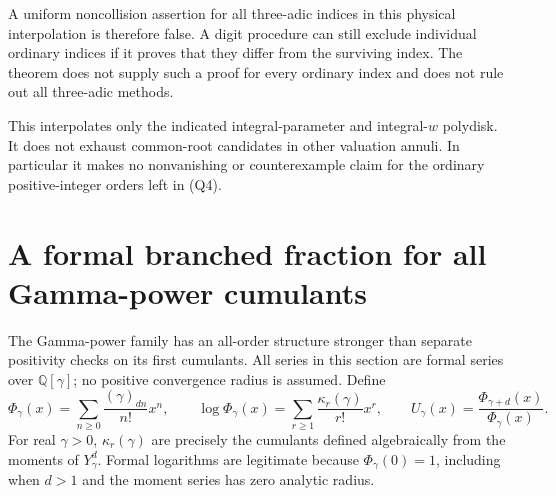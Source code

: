\documentclass[11pt]{article}
\begin{document}
A uniform noncollision assertion for all three-adic indices in this
physical interpolation is therefore false. A digit procedure can still
exclude individual ordinary indices if it proves that they differ from
the surviving index. The theorem does not supply such a proof for every
ordinary index and does not rule out all three-adic methods.

This interpolates only the indicated integral-parameter and integral-$w$
polydisk. It does not exhaust common-root candidates in other valuation
annuli. In particular it makes no nonvanishing or counterexample claim
for the ordinary positive-integer orders left in (Q4).


\section{A formal branched fraction for all Gamma-power cumulants}
The Gamma-power family has an all-order structure stronger than separate
positivity checks on its first cumulants. All series in this section are
formal series over $\mathbb Q[\gamma]$; no positive convergence radius is
assumed. Define
\[
 \Phi_\gamma(x)=\sum_{n\ge0}\frac{(\gamma)_{dn}}{n!}x^n,\qquad
 \log\Phi_\gamma(x)=\sum_{r\ge1}\frac{\kappa_r(\gamma)}{r!}x^r,
 \qquad U_\gamma(x)=\frac{\Phi_{\gamma+d}(x)}{\Phi_\gamma(x)}.
\]
For real $\gamma>0$, $\kappa_r(\gamma)$ are precisely the cumulants
defined algebraically from the moments of $Y_\gamma^d$. Formal
logarithms are legitimate because $\Phi_\gamma(0)=1$, including when
$d>1$ and the moment series has zero analytic radius.
\end{document}
